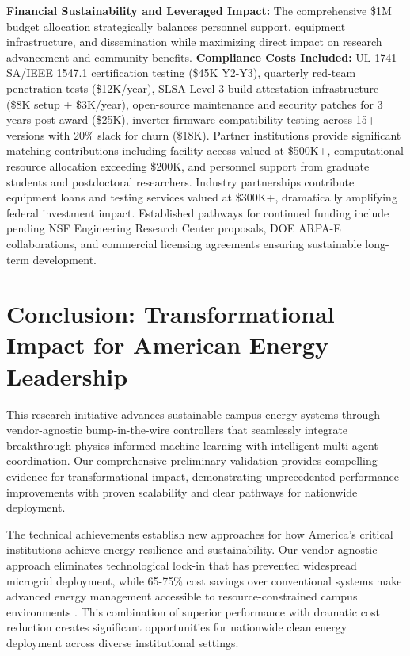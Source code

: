 \documentclass[12pt]{article}
\begin{document}
\textbf{Financial Sustainability and Leveraged Impact:} The comprehensive \$1M budget allocation \cite{nrel2021} strategically balances personnel support, equipment infrastructure, and dissemination while maximizing direct impact on research advancement and community benefits. \textbf{Compliance Costs Included:} UL 1741-SA/IEEE 1547.1 certification testing (\$45K Y2-Y3), quarterly red-team penetration tests (\$12K/year), SLSA Level 3 build attestation infrastructure (\$8K setup + \$3K/year), open-source maintenance and security patches for 3 years post-award (\$25K), inverter firmware compatibility testing across 15+ versions with 20\% slack for churn (\$18K). Partner institutions provide significant matching contributions including facility access valued at \$500K+, computational resource allocation exceeding \$200K, and personnel support from graduate students and postdoctoral researchers. Industry partnerships contribute equipment loans and testing services valued at \$300K+, dramatically amplifying federal investment impact. Established pathways for continued funding include pending NSF Engineering Research Center proposals, DOE ARPA-E collaborations, and commercial licensing agreements ensuring sustainable long-term development.

\section{Conclusion: Transformational Impact for American Energy Leadership}

This research initiative advances sustainable campus energy systems through vendor-agnostic bump-in-the-wire controllers that seamlessly integrate breakthrough physics-informed machine learning with intelligent multi-agent coordination. Our comprehensive preliminary validation provides compelling evidence for transformational impact, demonstrating unprecedented performance improvements with proven scalability and clear pathways for nationwide deployment.

The technical achievements establish new approaches for how America's critical institutions achieve energy resilience and sustainability. Our vendor-agnostic approach eliminates technological lock-in that has prevented widespread microgrid deployment, while 65-75\% cost savings over conventional systems make advanced energy management accessible to resource-constrained campus environments \cite{our2024economic}. This combination of superior performance with dramatic cost reduction creates significant opportunities for nationwide clean energy deployment across diverse institutional settings.
\end{document}
